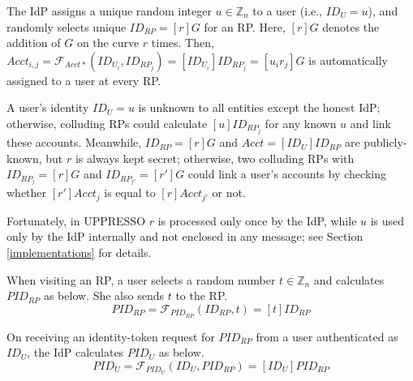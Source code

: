 The IdP assigns a unique random integer $u \in \mathbb{Z}_n$ to a user (i.e., $ID_U = u$),
 and randomly selects unique $ID_{RP} = [r]G$ for an RP. %
Here, %
 $[r]G$ denotes the addition of $G$ on the curve $r$ times.
Then, $Acct_{i,j} = \mathcal{F}_{Acct\ast}(ID_{U_i}, ID_{RP_j})= [ID_{U_i}]ID_{RP_j} =[u_ir_j]G$ is automatically assigned to a user at every RP.

A user's identity $ID_U = u$ is unknown to all entities except the honest IdP; otherwise, colluding RPs could calculate $[u]ID_{RP_j}$ for any known $u$ and link these accounts.
Meanwhile, $ID_{RP} = [r]G$ and $Acct = [ID_U]ID_{RP}$ are publicly-known,
 but $r$ is always kept secret;
otherwise, two colluding RPs with $ID_{RP_j} = [r]G$ and $ID_{RP_{j'}} = [r']G$ could link a user's accounts by checking whether $[r']Acct_j$ is equal to $[r]Acct_{j'}$ or not.

Fortunately, in UPPRESSO $r$ is processed only once by the IdP,
    while $u$ is used only by the IdP internally and
 not enclosed in any message; see Section \ref{implementations} for details.


 When visiting an RP,
a user selects a random number $t \in \mathbb{Z}_n$
    and calculates $PID_{RP}$ as below. She also sends $t$ to the RP.
\begin{equation}
PID_{RP} = \mathcal{F}_{PID_{RP}}(ID_{RP},t) = [t]{ID_{RP}}
\label{equ:PIDRP}
\end{equation}



On receiving an identity-token request for $PID_{RP}$ from a user authenticated as $ID_U$, the IdP calculates $PID_{U}$ as below.
\begin{equation}
PID_{U} = \mathcal{F}_{PID_U}(ID_U, PID_{RP}) =
  [{ID_U}]{PID_{RP}}
 \label{equ:PIDU}
\end{equation}

